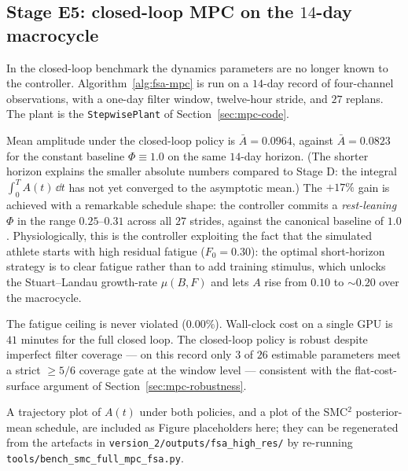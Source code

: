 \subsection{Stage E5: closed-loop MPC on the $14$-day macrocycle}

In the closed-loop benchmark the dynamics parameters are no longer known
to the controller. Algorithm~\ref{alg:fsa-mpc} is run on a
$14$-day record of four-channel observations, with a one-day filter
window, twelve-hour stride, and $27$ replans. The plant is the
\texttt{StepwisePlant} of Section~\ref{sec:mpc-code}.

Mean amplitude under the closed-loop policy is $\bar A = 0.0964$, against
$\bar A = 0.0823$ for the constant baseline $\Phi \equiv 1.0$ on the same
$14$-day horizon. (The shorter horizon explains the smaller absolute
numbers compared to Stage D: the integral $\int_0^T A(t)\,\dd t$ has not
yet converged to the asymptotic mean.) The $+17\%$ gain is achieved with
a remarkable schedule shape: the controller commits a
\emph{rest-leaning} $\Phi$ in the range $0.25$--$0.31$ across all $27$
strides, against the canonical baseline of $1.0$. Physiologically, this
is the controller exploiting the fact that the simulated athlete starts
with high residual fatigue ($F_0 = 0.30$): the optimal short-horizon
strategy is to clear fatigue rather than to add training stimulus, which
unlocks the Stuart--Landau growth-rate $\mu(B,F)$ and lets $A$ rise from
$0.10$ to $\sim 0.20$ over the macrocycle.

The fatigue ceiling is never violated ($0.00\%$). Wall-clock cost on a
single GPU is $41$ minutes for the full closed loop. The closed-loop
policy is robust despite imperfect filter coverage --- on this record
only $3$ of $26$ estimable parameters meet a strict $\ge 5/6$ coverage
gate at the window level --- consistent with the flat-cost-surface
argument of Section~\ref{sec:mpc-robustness}.

\medskip
A trajectory plot of $A(t)$ under both policies, and a plot of the
SMC${}^2$ posterior-mean schedule, are included as Figure
placeholders here; they can be regenerated from the artefacts in
\texttt{version\_2/outputs/fsa\_high\_res/} by re-running
\texttt{tools/bench\_smc\_full\_mpc\_fsa.py}.

\begin{center}
\end{center}

